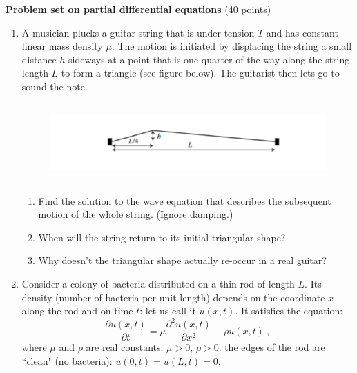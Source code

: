 \documentclass[fleqn]{article}
\begin{document}
  \pagebreak


  \textbf{Problem set on partial differential equations} (40 points)

  \begin{enumerate}

    \item A musician plucks a guitar string that is under tension $T$ and has constant linear mass density $\mu$. The motion is initiated by displacing the string a small distance $h$ sideways at a point that is one-quarter of the way along the string length $L$ to form a triangle (see figure below). The guitarist then lets go to sound the note. \\
    
      \begin{figure}[htbp]
        \begin{center}
          \includegraphics[height=3cm, width=15cm]{guitar.PNG}
        \label{default}
        \end{center}
      \end{figure}
    
      \begin{enumerate}
      \item Find the solution to the wave equation that describes the subsequent motion of the whole string. (Ignore damping.)
      \item When will the string return to its initial triangular shape?
      \item Why doesn't the triangular shape actually re-occur in a real guitar?
      \end{enumerate}
     
    
    \item  Consider a colony of bacteria distributed on a thin rod of length $L$. Its density (number of bacteria per unit length) depends on the coordinate $x$ along the rod and on time $t$: let us call it $u(x,t)$.  It satisfies the equation:
      \begin{equation}
    \frac{\partial u(x,t)}{\partial t} = \mu \frac{\partial^2 u(x,t)}{\partial x^2}+ \rho  u(x,t)~,
      \end{equation}
      where $\mu$ and $\rho$ are real constants: $\mu>0$, $\rho>0$.  the edges of the rod are ``clean" (no bacteria): $u(0,t)=u(L,t)=0$.
     \begin{enumerate}
    

\end{enumerate}
\end{enumerate}
\end{document}
